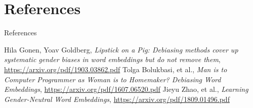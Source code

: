 \documentclass{beamer}
\begin{document}
\section{References}
	\begin{frame}{References}
		\small{
			\begin{thebibliography}{30}
				 Hila Gonen, Yoav Goldberg, \textit{Lipstick on a Pig: Debiasing methods cover up systematic gender biases in word embeddings but do not remove them}, \url{https://arxiv.org/pdf/1903.03862.pdf}
				 Tolga Bolukbasi, et al., \textit{Man is to Computer Programmer as Woman is to Homemaker? Debiasing Word Embeddings}, \url{https://arxiv.org/pdf/1607.06520.pdf}
				 Jieyu Zhao, et al., \textit{Learning Gender-Neutral Word Embeddings}, \url{https://arxiv.org/pdf/1809.01496.pdf}
			\end{thebibliography}
		}
	
	\end{frame}
\end{document}
